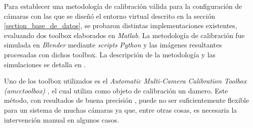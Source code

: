  
 
 Para establecer una metodología de calibración válida para la configuración de cámaras con las que se diseñó el entorno virtual descrito en la sección \ref{section_base_de_datos}, se probaron distintas implementaciones existentes, evaluando dos toolbox elaborados en \emph{Matlab}. La metodología de calibración fue simulada en \emph{Blender} mediante \textit{scripts} \emph{Python} y las imágenes resultantes procesadas con dichos toolbox. La descripción de la metodología y las simulaciones se detalla en \cite{proyecto_biomecanica}.\
 
 Uno de los toolbox utilizados es el \textit{Automatic Multi-Camera Calibration Toolbox (amcctoolbox)} \cite{amcctoolbox}, el cual utiliza como objeto de calibración un damero. Este método, con resultados de buena precisión \cite{zhang_libro}, puede no ser suficientemente flexible para un sistema de muchas cámaras ya que, entre otras cosas, es necesaria la intervención manual en algunos casos.\
 
